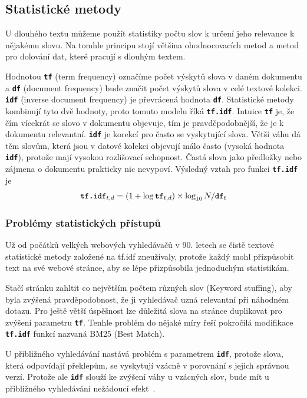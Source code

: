 \documentclass[11pt,letterpaper,oneside,openright]{book}
\newcommand{\bftt}[1]{\texttt{\textbf{#1}}}
\begin{document}
\subsection{Statistické metody}
U dlouhého textu můžeme použít statistiky počtu slov k určení jeho relevance k
nějakému slovu. Na tomhle principu stojí většina ohodnocovacích metod a metod
pro dolování dat, které pracují s dlouhým textem.  

Hodnotou \bftt{tf} (term frequency) označíme počet výskytů slova v daném
dokumentu a \bftt{df} (document frequency) bude značit počet výskytů slova v
celé textové kolekci. \bftt{idf} (inverse document frequency) je převrácená
hodnota \bftt{df}. Statistické metody kombinují tyto dvě hodnoty, proto tomuto
modelu říká \bftt{tf.idf}. Intuice \bftt{tf} je, že čím vícekrát se slovo v
dokumentu objevuje, tím je pravděpodobnější, že je k dokumentu relevantní.
\bftt{idf} je korekcí pro často se vyskytující slova. Větší váhu dá těm slovům,
která jsou v datové kolekci objevují málo často (vysoká hodnota \bftt{idf}),
protože mají vysokou rozlišovací schopnost. Častá slova jako předložky nebo
zájmena o dokumentu prakticky nic nevypoví. Výsledný vztah pro funkci
\bftt{tf.idf} je \[\bftt{tf.idf}_{t, d} = (1 + \log \bftt{tf}_{t, d}) \times
\log_{10} N / \bftt{df}_{t}\]

\subsubsection{Problémy statistických přístupů}
Už od počátků velkých webových vyhledávačů v 90. letech se čistě textové
statistické metody založené na tf.idf zneužívaly, protože každý mohl
přizpůsobit text na své webové stránce, aby se lépe přizpůsobila
jednoduchým statistikám.

Stačí stránku zahltit co největším počtem různých slov (Keyword stuffing), aby
byla zvýšená pravděpodobnost, že ji vyhledávač uzná relevantní při náhodném
dotazu. Pro ještě větší úspěšnost lze důležitá slova na stránce duplikovat pro
zvýšení parametru \bftt{tf}. Tenhle problém do nějaké míry řeší pokročilá
modifikace \bftt{tf.idf} funkcí nazvaná BM25 (Best Match).

U přibližného vyhledávání nastává problém s parametrem \bftt{idf}, protože slova,
která odpovídají překlepům, se vyskytují vzácně v porovnání s jejich správnou
verzí. Protože ale \bftt{idf} slouží ke zvýšení váhy u vzácných slov, bude mít
u přibližného vyhledávání nežádoucí efekt~\cite{elastic_fuzzy}.
\end{document}
